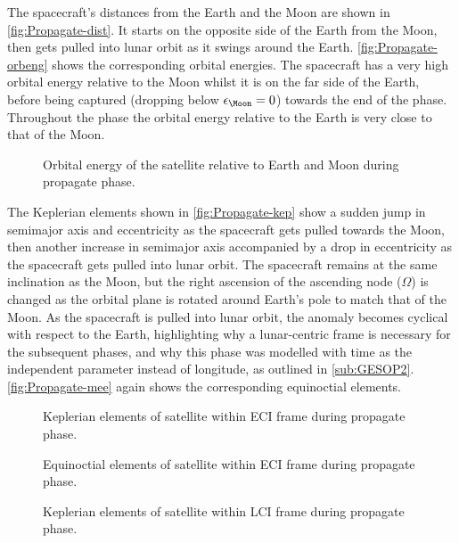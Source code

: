 The spacecraft's distances from the Earth and the Moon are shown in \autoref{fig:Propagate-dist}. It starts on the opposite side of the Earth from the Moon, then gets pulled into lunar orbit as it swings around the Earth. \autoref{fig:Propagate-orbeng} shows the corresponding orbital energies. The spacecraft has a very high orbital energy relative to the Moon whilst it is on the far side of the Earth, before being captured (dropping below $\epsilon_\Moon=0$) towards the end of the phase. Throughout the phase the orbital energy relative to the Earth is very close to that of the Moon.

\begin{figure}
\centering
\def\svgwidth{\figurewidth}

\caption{Orbital energy of the satellite relative to Earth and Moon during propagate phase.} \label{fig:Propagate-orbeng}
\end{figure}

The Keplerian elements shown in \autoref{fig:Propagate-kep} show a sudden jump in semimajor axis and eccentricity as the spacecraft gets pulled towards the Moon, then another increase in semimajor axis accompanied by a drop in eccentricity as the spacecraft gets pulled into lunar orbit. The spacecraft remains at the same inclination as the Moon, but the right ascension of the ascending node ($\Omega$) is changed as the orbital plane is rotated around Earth's pole to match that of the Moon. As the spacecraft is pulled into lunar orbit, the anomaly becomes cyclical with respect to the Earth, highlighting why a lunar-centric frame is necessary for the subsequent phases, and why this phase was modelled with time as the independent parameter instead of longitude, as outlined in \autoref{sub:GESOP2}. \autoref{fig:Propagate-mee} again shows the corresponding equinoctial elements.

\begin{figure}
\centering
\def\svgwidth{\figurewidth}

\caption{Keplerian elements of satellite within ECI frame during propagate phase.} \label{fig:Propagate-kep}
\end{figure}

\begin{figure}
\centering
\def\svgwidth{\figurewidth}

\caption{Equinoctial elements of satellite within ECI frame during propagate phase.} \label{fig:Propagate-mee}
\end{figure}

\begin{figure}
\centering
\def\svgwidth{\figurewidth}

\caption{Keplerian elements of satellite within LCI frame during propagate phase.} \label{fig:Propagate-kep-lci}
\end{figure}

